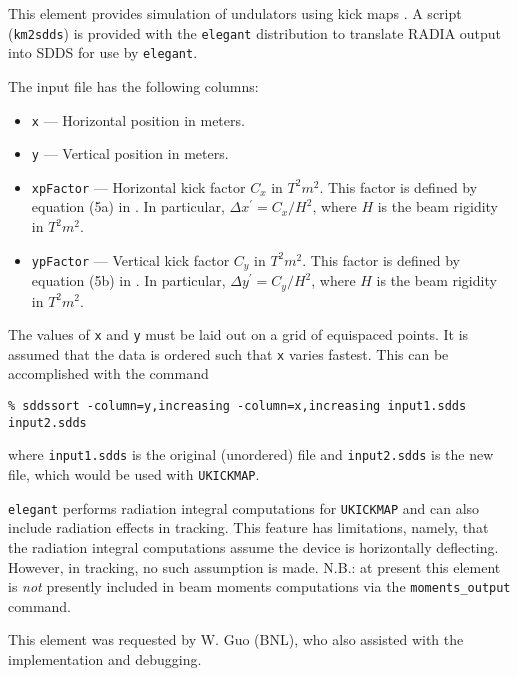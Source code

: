 This element provides simulation of undulators using kick maps \cite{Elleaume1992}.
A script (\verb|km2sdds|) is provided with the {\tt elegant}
distribution to translate RADIA \cite{radia} output into SDDS for use by
\verb|elegant|.

The input file has the following columns:
\begin{itemize}
\item \verb|x| --- Horizontal position in meters.
\item \verb|y| --- Vertical position in meters.
\item \verb|xpFactor| --- Horizontal kick factor $C_x$ in $T^2 m^2$.  This factor is defined by
equation (5a) in \cite{Elleaume1992}.  In particular, $\Delta x^\prime = C_x/H^2$, where
$H$ is the beam rigidity in  $T^2 m^2$.
\item \verb|ypFactor| --- Vertical kick factor $C_y$ in $T^2 m^2$. This factor is defined by
equation (5b) in \cite{Elleaume1992}.  In particular, $\Delta y^\prime = C_y/H^2$, where
$H$ is the beam rigidity in  $T^2 m^2$.
\end{itemize}
The values of \verb|x| and \verb|y| must be laid out on a grid of equispaced points.
It is assumed that the data is ordered such that \verb|x| varies fastest.  This can be
accomplished with the command
\begin{verbatim}
% sddssort -column=y,increasing -column=x,increasing input1.sdds input2.sdds
\end{verbatim}
where \verb|input1.sdds| is the original (unordered) file and \verb|input2.sdds| is the
new file, which would be used with \verb|UKICKMAP|.

{\tt elegant} performs radiation integral computations
for \verb|UKICKMAP| and can also include radiation effects in
tracking.  This feature has limitations, namely, that the radiation
integral computations assume the device is horizontally deflecting.
However, in tracking, no such assumption is made.  N.B.: at present
this element is {\em not} presently included in beam moments
computations via the \verb|moments_output| command.

This element was requested by W. Guo (BNL), who also assisted with the
implementation and debugging.

